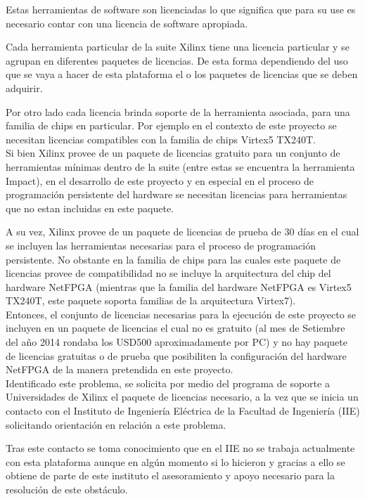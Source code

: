 Estas herramientas de software son licenciadas lo que significa que para su use es necesario contar con una licencia de software apropiada.

Cada herramienta particular de la suite Xilinx tiene una licencia particular y se agrupan en diferentes paquetes de licencias. De esta forma dependiendo del uso que se vaya a hacer de esta plataforma el o los paquetes de licencias que se deben adquirir.

Por otro lado cada licencia brinda soporte de la herramienta asociada, para una familia de chips en particular. Por ejemplo en el contexto de este proyecto se necesitan licencias compatibles con la familia de chips Virtex5 TX240T.\\

Si bien Xilinx provee de un paquete de licencias gratuito para un conjunto de herramientas mínimas dentro de la suite (entre estas se encuentra la herramienta Impact), en el desarrollo de este proyecto y en especial en el proceso de programaci\'on persistente del hardware se necesitan licencias para herramientas que no estan incluidas en este paquete.

A su vez, Xilinx provee de un paquete de licencias de prueba de 30 días en el cual se incluyen las herramientas necesarias para el proceso de programaci\'on persistente. No obstante en la familia de chips para las cuales este paquete de licencias provee de compatibilidad no se incluye la arquitectura del chip del hardware NetFPGA (mientras que la familia del hardware NetFPGA es Virtex5 TX240T, este paquete soporta familias de la arquitectura Virtex7).\\

Entonces, el conjunto de licencias necesarias para la ejecuci\'on de este proyecto se incluyen en un paquete de licencias el cual no es gratuito (al mes de Setiembre del año 2014 rondaba los USD500 aproximadamente por PC) y no hay paquete de licencias gratuitas o de prueba que posibiliten la configuraci\'on del hardware NetFPGA de la manera pretendida en este proyecto.\\

Identificado este problema, se solicita por medio del programa de soporte a Universidades de Xilinx el paquete de licencias necesario, a la vez que se inicia un contacto con el Instituto de Ingeniería Eléctrica de la Facultad de Ingeniería (IIE) solicitando orientación en relación a este problema.

Tras este contacto se toma conocimiento que en el IIE no se trabaja actualmente con esta plataforma aunque en alg\'un momento si lo hicieron y gracias a ello se obtiene de parte de este instituto
el asesoramiento y apoyo necesario para la resolución de este obstáculo. 

